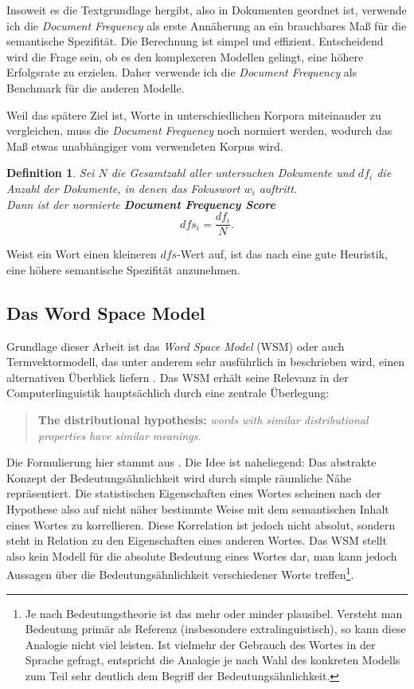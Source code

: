 \documentclass[11pt,numbers=noenddot]{scrartcl}
\newtheorem*{defi}{Definition}
\begin{document}
Insoweit es die Textgrundlage hergibt, also in Dokumenten geordnet ist, verwende ich die \emph{Document Frequency} als erste Annäherung an ein brauchbares Maß für die semantische Spezifität. Die Berechnung ist simpel und effizient. Entscheidend wird die Frage sein, ob es den komplexeren Modellen gelingt, eine höhere Erfolgsrate zu erzielen. Daher verwende ich die \emph{Document Frequency} als Benchmark für die anderen Modelle.

Weil das spätere Ziel ist, Worte in unterschiedlichen Korpora miteinander zu vergleichen, muss die \emph{Document Frequency} noch normiert werden, wodurch das Maß etwas unabhängiger vom verwendeten Korpus wird.

\begin{defi}
Sei $N$ die Gesamtzahl aller untersuchen Dokumente und $df_i$ die Anzahl der Dokumente, in denen das Fokuswort $w_i$ auftritt. \\ Dann ist der normierte \textbf{Document Frequency Score}
\begin{equation}
    dfs_i = \frac{df_i}{N}.
\end{equation}
\end{defi}

Weist ein Wort einen kleineren $dfs$-Wert auf, ist das nach \citet{Caraballo99determiningthe} eine gute Heuristik, eine höhere semantische Spezifität anzunehmen.

\subsection{Das Word Space Model}\label{wsm}
Grundlage dieser Arbeit ist das \emph{Word Space Model} (WSM) oder auch Termvektormodell, das unter anderem sehr ausführlich in \citet{sahlgren2006word} beschrieben wird, einen alternativen Überblick liefern \citet{Turney10fromfrequency}. Das WSM erhält seine Relevanz in der Computerlinguistik hauptsächlich durch eine zentrale Überlegung:
\begin{quote}
    \textbf{The distributional hypothesis:} \emph{words with similar distributional properties have similar meanings.}
\end{quote}
Die Formulierung hier stammt aus \citet[S. 21]{sahlgren2006word}. Die Idee ist naheliegend: Das abstrakte Konzept der Bedeutungsähnlichkeit wird durch simple räumliche Nähe repräsentiert. Die statistischen Eigenschaften eines Wortes scheinen nach der Hypothese also auf nicht näher bestimmte Weise mit dem semantischen Inhalt eines Wortes zu korrellieren. Diese Korrelation ist jedoch nicht absolut, sondern steht in Relation zu den Eigenschaften eines anderen Wortes. Das WSM stellt also kein Modell für die absolute Bedeutung eines Wortes dar, man kann jedoch Aussagen über die Bedeutungsähnlichkeit verschiedener Worte treffen\footnote{Je nach Bedeutungstheorie ist das mehr oder minder plausibel. Versteht man Bedeutung primär als Referenz (insbesondere extralinguistisch), so kann diese Analogie nicht viel leisten. Ist vielmehr der Gebrauch des Wortes in der Sprache gefragt, entspricht die Analogie je nach Wahl des konkreten Modells zum Teil sehr deutlich dem Begriff der Bedeutungsähnlichkeit.}.
\end{document}
